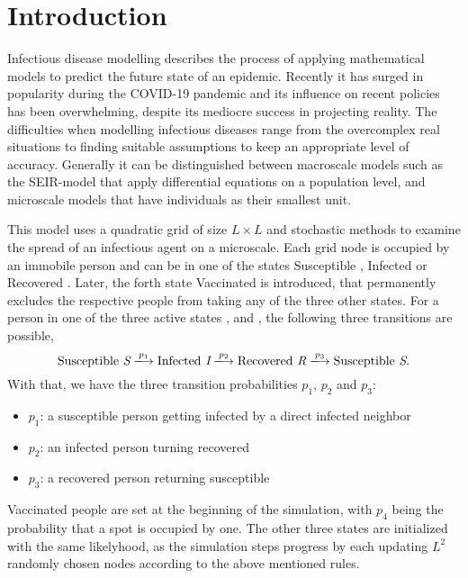 \section{Introduction}


Infectious disease modelling describes the process of applying mathematical models to predict the future state of an epidemic. 
Recently it has surged in popularity during the COVID-19 pandemic and its influence on recent policies has been overwhelming, despite its mediocre success in projecting reality. 
The difficulties when modelling infectious diseases range from the overcomplex real situations to finding suitable assumptions to keep an appropriate level of accuracy.
Generally it can be distinguished between macroscale models such as the SEIR-model\cite{SEIR_Heidelberg} that apply differential equations on a population level, 
and microscale models that have individuals as their smallest unit.

This model uses a quadratic grid of size $L\times L$ and stochastic methods to examine the spread of an infectious agent on a microscale. Each grid node is occupied by an immobile person and can be in one of the states
Susceptible \susceptible{}, Infected \infected{} or Recovered \recovered{}. Later, the forth state Vaccinated \vaccinated{} is introduced, that permanently excludes the respective people from taking any of the three other states. 
For a person in one of the three active states \susceptible{}, \infected{} and \recovered{}, the following three transitions are possible,
\begin{equation*}
    \mathrm{Susceptible}~\susceptible\xlongrightarrow{p_1}\mathrm{Infected}~\infected{}\xlongrightarrow{p_2}\mathrm{Recovered}~\recovered{}\xlongrightarrow{p_3}\mathrm{Susceptible}~\susceptible{}.
\end{equation*}
With that, we have the three transition probabilities $p_1$, $p_2$ and $p_3$:
\begin{itemize}
    \item $p_1$: a susceptible person getting infected by a direct infected neighbor
    \item $p_2$: an infected person turning recovered
    \item $p_3$: a recovered person returning susceptible
\end{itemize}
Vaccinated people \vaccinated{} are set at the beginning of the simulation, with $p_4$ being the probability that a spot is occupied by one. The other three states are initialized with the same likelyhood, as the 
simulation steps progress by each updating $L^2$ randomly chosen nodes according to the above mentioned rules.

